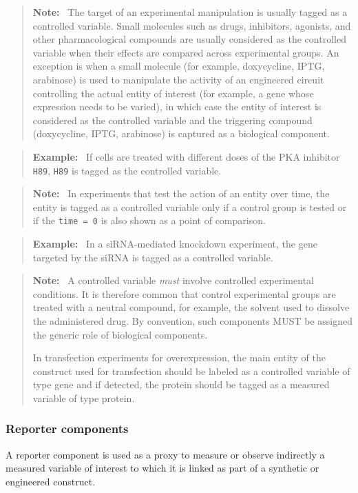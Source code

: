 \documentclass{bioinfo}
\newenvironment{note}
{\par\color{black}\begin{quote}\textbf{Note:}\ }
{\end{quote}\par}
\newenvironment{example}
{\par\color{black}\begin{quote}\textbf{Example:}\ }
{\end{quote}\par}
\begin{document}
\begin{note}
    The target of an experimental manipulation is usually tagged as a controlled variable. Small molecules such as drugs, inhibitors, agonists, and other pharmacological compounds are usually considered as the controlled variable when their effects are compared across experimental groups. An exception is when a small molecule (for example, doxycycline, IPTG, arabinose) is used to manipulate the activity of an engineered circuit controlling the actual entity of interest (for example, a gene whose expression needs to be varied), in which case the entity of interest is considered as the controlled variable and the triggering compound (doxycycline, IPTG, arabinose) is captured as a biological component.
\end{note}

\begin{example}
    If cells are treated with different doses of the PKA inhibitor \texttt{H89}, \texttt{H89} is tagged as the controlled variable. 
\end{example}

\begin{note}
    In experiments that test the action of an entity over time, the entity is tagged as a controlled variable only if a control group is tested or if the \texttt{time = 0} is also shown as a point of comparison.
\end{note}

\begin{example}
    In a siRNA-mediated knockdown experiment, the gene targeted by the siRNA is tagged as a controlled variable.
\end{example}

\begin{note}
    A controlled variable \textit{must} involve controlled experimental conditions. It is therefore common that control experimental groups are treated with a neutral compound, for example, the solvent used to dissolve the administered drug. By convention, such components MUST be assigned the generic role of biological components.
    
    In transfection experiments for overexpression, the main entity of the construct used for transfection should be labeled as a controlled variable of type gene and if detected, the protein should be tagged as a measured variable of type protein.
\end{note}

\subsubsection{Reporter components}\label{app:reporter-components}
A reporter component is used as a proxy to measure or observe indirectly a measured variable of interest to which it is linked as part of a synthetic or engineered construct.
\end{document}
